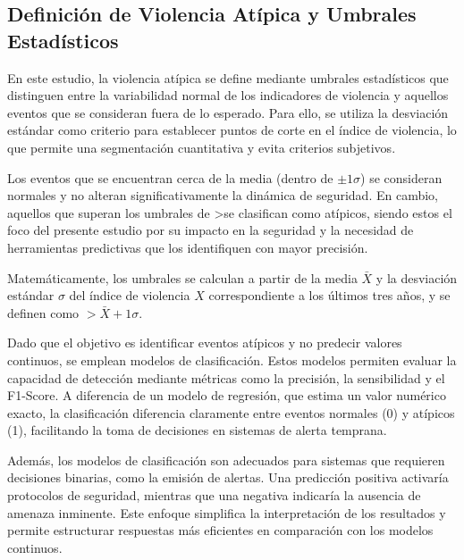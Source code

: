 \subsection*{Definición de Violencia Atípica y Umbrales Estadísticos}

En este estudio, la violencia atípica se define mediante umbrales estadísticos que distinguen entre la variabilidad normal de los indicadores de violencia y aquellos eventos que se consideran fuera de lo esperado. Para ello, se utiliza la desviación estándar como criterio para establecer puntos de corte en el índice de violencia, lo que permite una segmentación cuantitativa y evita criterios subjetivos.

Los eventos que se encuentran cerca de la media (dentro de $\pm1\sigma$) se consideran normales y no alteran significativamente la dinámica de seguridad. En cambio, aquellos que superan los umbrales de >se clasifican como atípicos, siendo estos el foco del presente estudio por su impacto en la seguridad y la necesidad de herramientas predictivas que los identifiquen con mayor precisión.

Matemáticamente, los umbrales se calculan a partir de la media $\bar{X}$ y la desviación estándar $\sigma$ del índice de violencia $X$ correspondiente a los últimos tres años, y se definen como $>\bar{X} + 1\sigma$.

Dado que el objetivo es identificar eventos atípicos y no predecir valores continuos, se emplean modelos de clasificación. Estos modelos permiten evaluar la capacidad de detección mediante métricas como la precisión, la sensibilidad y el F1-Score. A diferencia de un modelo de regresión, que estima un valor numérico exacto, la clasificación diferencia claramente entre eventos normales (0) y atípicos (1), facilitando la toma de decisiones en sistemas de alerta temprana.

Además, los modelos de clasificación son adecuados para sistemas que requieren decisiones binarias, como la emisión de alertas. Una predicción positiva activaría protocolos de seguridad, mientras que una negativa indicaría la ausencia de amenaza inminente. Este enfoque simplifica la interpretación de los resultados y permite estructurar respuestas más eficientes en comparación con los modelos continuos.